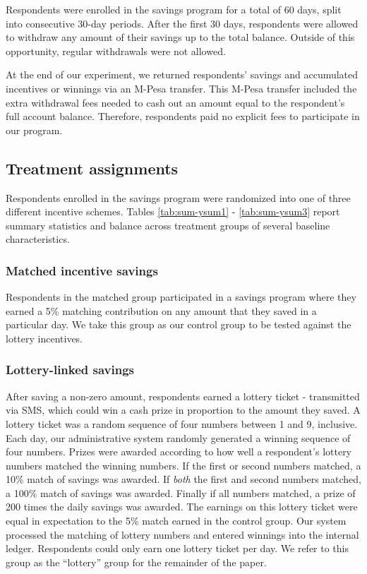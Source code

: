\documentclass[10pt]{article}
\begin{document}
		Respondents were enrolled in the savings program for a total of 60 days, split into consecutive 30-day periods. After the first 30 days, respondents were allowed to withdraw any amount of their savings up to the total balance. Outside of this opportunity, regular withdrawals were not allowed.

		At the end of our experiment, we returned respondents’ savings and accumulated incentives or winnings via an M-Pesa transfer. This M-Pesa transfer included the extra withdrawal fees needed to cash out an amount equal to the respondent’s full account balance. Therefore, respondents paid no explicit fees to participate in our program.

		\subsection{Treatment assignments}

		Respondents enrolled in the savings program were randomized into one of three different incentive schemes. Tables \ref{tab:sum-ysum1} - \ref{tab:sum-ysum3} report summary statistics and balance across treatment groups of several baseline characteristics.

			\subsubsection{Matched incentive savings}

				Respondents in the matched group participated in a savings program where they earned a 5\% matching contribution on any amount that they saved in a particular day. We take this group as our control group to be tested against the lottery incentives.

			\subsubsection{Lottery-linked savings}

				After saving a non-zero amount, respondents earned a lottery ticket - transmitted via SMS, which could win a cash prize in proportion to the amount they saved. A lottery ticket was a random sequence of four numbers between 1 and 9, inclusive. Each day, our administrative system randomly generated a winning sequence of four numbers. Prizes were awarded according to how well a respondent’s lottery numbers matched the winning numbers. If the first or second numbers matched, a 10\% match of savings was awarded. If \emph{both} the first and second numbers matched, a 100\% match of savings was awarded. Finally if all numbers matched, a prize of 200 times the daily savings was awarded. The earnings on this lottery ticket were equal in expectation to the 5\% match earned in the control group. Our system processed the matching of lottery numbers and entered winnings into the internal ledger. Respondents could only earn one lottery ticket per day. We refer to this group as the ``lottery'' group for the remainder of the paper.
\end{document}
